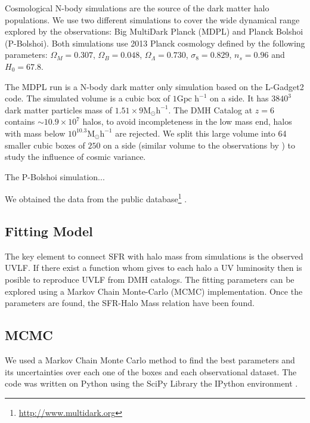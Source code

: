 \documentclass{emulateapj}
\newcommand{\hMpc}{{\ifmmode{h^{-1}{\rm Mpc}}\else{$h^{-1}$Mpc }\fi}}
\begin{document}
Cosmological N-body simulations are the source of the dark matter halo
populations.
We use two different simulations to cover the wide dynamical range
explored by the observations: Big MultiDark Planck (MDPL) and Planck
Bolshoi (P-Bolshoi). 
Both simulations use 2013 Planck cosmology  defined by the following
parameters: $\Omega_M = 0.307$, $\Omega_B = 0.048$, $\Omega_\Lambda =
0.730$, $\sigma_8 = 0.829$, $n_s = 0.96$ and  $H_0 = 67.8$.  

The MDPL run is a N-body dark matter only simulation based on the L-Gadget2 
code. 
The simulated volume is a cubic box of $1 \textrm{Gpc h}^{-1}$ on a side.
It has $3840^3$ dark matter particles mass of $1.51\times 9
\textrm{M}_{\odot} \textrm{h}^{-1}$.
The DMH Catalog at $z=6$ contains $\sim 10.9 \times 10^7$   halos, to
avoid incompleteness in the low mass end, halos with mass below
$10^{10.3} \textrm{M}_{\odot} \textrm{h}^{-1}$ are rejected. 
We split this large volume into 64 smaller cubic boxes of $250$\hMpc
on a side (similar volume to the observations by \citet{Willott13}) to
study the influence of cosmic variance. 

The P-Bolshoi simulation...


We obtained the data from the public
database\footnote{\url{http://www.multidark.org}} \citep{Riebe13}. 



\subsection{Fitting Model}



The key element to connect SFR with halo mass from simulations is the observed 
UVLF. If there exist a function whom gives to each halo a UV luminosity then is 
posible to reproduce UVLF from DMH catalogs. The fitting parameters can be 
explored using a Markov Chain Monte-Carlo (MCMC) implementation. Once the 
parameters are found, the SFR-Halo Mass relation have been found.



\subsection{MCMC}
We used a Markov Chain Monte Carlo method to find the best parameters and its 
uncertainties over each one of the boxes and each observational dataset. The 
code was written on Python using the SciPy Library \citep{SciPy}
the IPython environment \citep{IPython}.
\end{document}
